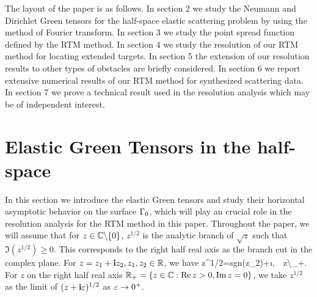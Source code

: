 \documentclass[12pt]{iopart}
\begin{document}
The layout of the paper is as follows. In section 2 we study the Neumann and Dirichlet Green tensors for the half-space elastic scattering problem by using the method of Fourier transform. In section 3 we study the point spread function defined by the RTM method. In section 4 we study the resolution of our RTM method for locating extended targets. In section 5 the extension of our resolution results to other types of obstacles are briefly considered. In section 6 we report extensive numerical results of our RTM method
for synthesized scattering data. In section 7 we prove a technical result used in the resolution analysis which may be of independent interest.

\section{Elastic Green Tensors in the half-space}

In this section we introduce the elastic Green tensors and study their horizontal asymptotic behavior on the surface $\Gamma_0$, which will play an crucial role in the resolution analysis for the RTM method in this paper. Throughout the paper, we will assume that for $z\in\mathbb{C}\backslash\{0\}$, $z^{1/2}$ is the analytic branch of $\sqrt{z}$ such that $\Im (z^{1/2})\geq0$. This corresponds to the right half real axis as the branch cut in the complex plane. For $z=z_1+\mathbf{i} z_2,z_1,z_2\in\mathbb{R}$, we have
\be \label{convention_1}
z^{1/2}={\rm sgn}(z_2)+\i{},\ \ \forall z\in\C\backslash{\R}_+.
\ee
For $z$ on the right half real axis $\mathbb{R}_+=\{z\in{\mathbb{C}}:\mathrm{Re}\, z>0,\mathrm{Im}\, z=0\}$, we take $z^{1/2}$ as the limit of $(z+\mathbf{i}\varepsilon)^{1/2}$ as $\varepsilon \to 0^+$.
\end{document}
